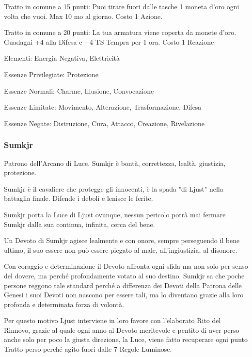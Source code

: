 \documentclass[a4paper,11pt,twoside,openany]{book}
\begin{document}
{Tratto in comune a 15 punti: Puoi tirare fuori dalle tasche 1 moneta d'oro ogni volta che vuoi. Max 10 mo al giorno. Costo 1 Azione.

Tratto in comune a 20 punti: La tua armatura viene coperta da monete d'oro. Guadagni +4 alla Difesa e +4 TS Tempra per 1 ora. Costo 1 Reazione 

\bigskip

Elementi: Energia Negativa, Elettricità

\bigskip

Essenze Privilegiate: Protezione

Essenze Normali: Charme, Illusione, Convocazione

Essenze Limitate: Movimento, Alterazione, Trasformazione, Difesa

Essenze Negate: Distruzione, Cura, Attacco, Creazione, Rivelazione

\subsubsection{Sumkjr}

\label{sumkjr}

Patrono dell'Arcano di Luce. Sumkjr è bontà, correttezza, lealtà, giustizia, protezione.

Sumkjr è il cavaliere che protegge gli innocenti, è la spada "di Ljust" nella battaglia finale. Difende i deboli e lenisce le ferite.

Sumkjr porta la Luce di Ljust ovunque, nessun pericolo potrà mai fermare Sumkjr dalla sua continua, infinita, cerca del bene.

Un Devoto di Sumkjr agisce lealmente e con onore, sempre perseguendo il bene ultimo, il suo essere non può essere piegato al male, all'ingiustizia, al disonore.

Con coraggio e determinazione il Devoto affronta ogni sfida ma non solo per senso del dovere, ma perché profondamente votato al suo destino. Sumkjr sa che poche persone reggono tale standard perché a differenza dei Devoti della Patrona delle Genesi i suoi Devoti non nascono per essere tali, ma lo diventano grazie alla loro profonda e determinata forza di volontà.

Per questo motivo Ljust interviene in loro favore con l'elaborato Rito del Rinnovo, grazie al quale ogni anno al Devoto meritevole e pentito di aver perso anche solo per poco la giusta direzione, la Luce, viene fatto recuperare ogni punto Tratto perso perché agito fuori dalle 7 Regole Luminose.

}
\end{document}
